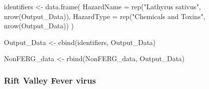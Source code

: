 \documentclass[
  letterpaper,
  DIV=11,
  numbers=noendperiod]{scrartcl}
\newenvironment{Shaded}{\begin{snugshade}}{\end{snugshade}}
\newcommand{\AttributeTok}[1]{\textcolor[rgb]{0.40,0.45,0.13}{#1}}
\newcommand{\FunctionTok}[1]{\textcolor[rgb]{0.28,0.35,0.67}{#1}}
\newcommand{\NormalTok}[1]{\textcolor[rgb]{0.00,0.23,0.31}{#1}}
\newcommand{\OtherTok}[1]{\textcolor[rgb]{0.00,0.23,0.31}{#1}}
\newcommand{\StringTok}[1]{\textcolor[rgb]{0.13,0.47,0.30}{#1}}
\begin{document}
\begin{Shaded}
\begin{Highlighting}[]
\NormalTok{identifiers }\OtherTok{\textless{}{-}} \FunctionTok{data.frame}\NormalTok{(}
 \AttributeTok{HazardName =} \FunctionTok{rep}\NormalTok{(}\StringTok{"Lathyrus sativus"}\NormalTok{,  }\FunctionTok{nrow}\NormalTok{(Output\_Data)), }
 \AttributeTok{HazardType =} \FunctionTok{rep}\NormalTok{(}\StringTok{"Chemicals and Toxins"}\NormalTok{,  }\FunctionTok{nrow}\NormalTok{(Output\_Data))}
\NormalTok{ )}
         

\NormalTok{Output\_Data }\OtherTok{\textless{}{-}} \FunctionTok{cbind}\NormalTok{(identifiers,  Output\_Data)}

\NormalTok{NonFERG\_data }\OtherTok{\textless{}{-}} \FunctionTok{rbind}\NormalTok{(NonFERG\_data,  Output\_Data)}
\end{Highlighting}
\end{Shaded}

\subsubsection{Rift Valley Fever virus}\label{rift-valley-fever-virus}
\end{document}
